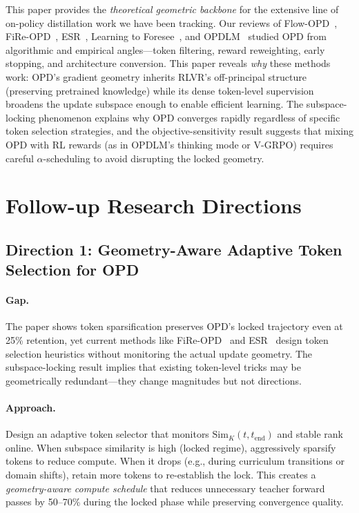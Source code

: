 \documentclass[11pt,a4paper]{article}
\begin{document}
This paper provides the \emph{theoretical geometric backbone} for the extensive line of on-policy distillation work we have been tracking. Our reviews of Flow-OPD~\cite{fu2026flowopd}, FiRe-OPD~\cite{li2026fireopd}, ESR~\cite{wang2026esr}, Learning to Foresee~\cite{chen2026foresee}, and OPDLM~\cite{su2026opdlm} studied OPD from algorithmic and empirical angles---token filtering, reward reweighting, early stopping, and architecture conversion. This paper reveals \emph{why} these methods work: OPD's gradient geometry inherits RLVR's off-principal structure (preserving pretrained knowledge) while its dense token-level supervision broadens the update subspace enough to enable efficient learning. The subspace-locking phenomenon explains why OPD converges rapidly regardless of specific token selection strategies, and the objective-sensitivity result suggests that mixing OPD with RL rewards (as in OPDLM's thinking mode or V-GRPO) requires careful $\alpha$-scheduling to avoid disrupting the locked geometry.

\section{Follow-up Research Directions}

\subsection{Direction 1: Geometry-Aware Adaptive Token Selection for OPD}

\paragraph{Gap.} The paper shows token sparsification preserves OPD's locked trajectory even at 25\% retention, yet current methods like FiRe-OPD~\cite{li2026fireopd} and ESR~\cite{wang2026esr} design token selection heuristics without monitoring the actual update geometry. The subspace-locking result implies that existing token-level tricks may be geometrically redundant---they change magnitudes but not directions.

\paragraph{Approach.} Design an adaptive token selector that monitors $\mathrm{Sim}_K(t, t_{\mathrm{end}})$ and stable rank online. When subspace similarity is high (locked regime), aggressively sparsify tokens to reduce compute. When it drops (e.g., during curriculum transitions or domain shifts), retain more tokens to re-establish the lock. This creates a \emph{geometry-aware compute schedule} that reduces unnecessary teacher forward passes by 50--70\% during the locked phase while preserving convergence quality.
\end{document}
